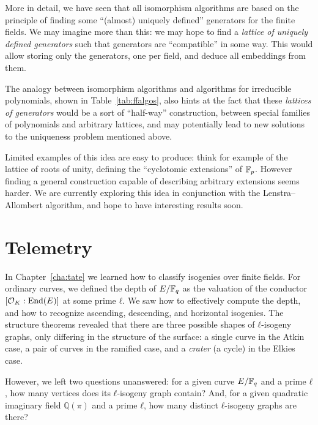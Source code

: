 \documentclass[b5layout]{hdr}
\begin{document}
More in detail, we have seen that all isomorphism algorithms are based
on the principle of finding some ``(almost) uniquely defined''
generators for the finite fields. %
We may imagine more than this: we may hope to find a \emph{lattice of
  uniquely defined generators} such that generators are ``compatible''
in some way. %
This would allow storing only the generators, one per field, and
deduce all embeddings from them. %

The analogy between isomorphism algorithms and algorithms for
irreducible polynomials, shown in Table~\ref{tab:ffalgos}, also hints
at the fact that these \emph{lattices of generators} would be a sort
of ``half-way'' construction, between special families of polynomials
and arbitrary lattices, and may potentially lead to new solutions to
the uniqueness problem mentioned above.

Limited examples of this idea are easy to produce: think for example
of the lattice of roots of unity, defining the ``cyclotomic
extensions'' of $\mathbb{F}_p$. %
However finding a general construction capable of describing arbitrary
extensions seems harder. %
We are currently exploring this idea in conjunction with the
Lenstra--Allombert algorithm, and hope to have interesting results
soon. %



\chapter{Telemetry}
\label{cha:crypto}

In Chapter~\ref{cha:tate} we learned how to classify isogenies over
finite fields. %
For ordinary curves, we defined the depth of $E/\mathbb{F}_q$ as the valuation
of the conductor $[\mathcal{O}_K:\operatorname{End}(E)]$ at some prime $ℓ$. %
We saw how to effectively compute the depth, and how to recognize
ascending, descending, and horizontal isogenies. %
The structure theorems revealed that there are three possible shapes
of $ℓ$-isogeny graphs, only differing in the structure of the surface:
a single curve in the Atkin case, a pair of curves in the ramified
case, and a \emph{crater} (a cycle) in the Elkies case. %

However, we left two questions unanswered: for a given curve $E/\mathbb{F}_q$
and a prime $ℓ$, how many vertices does its $ℓ$-isogeny graph
contain? %
And, for a given quadratic imaginary field $ℚ(π)$ and a prime $ℓ$, how
many distinct $ℓ$-isogeny graphs are there?
\end{document}
